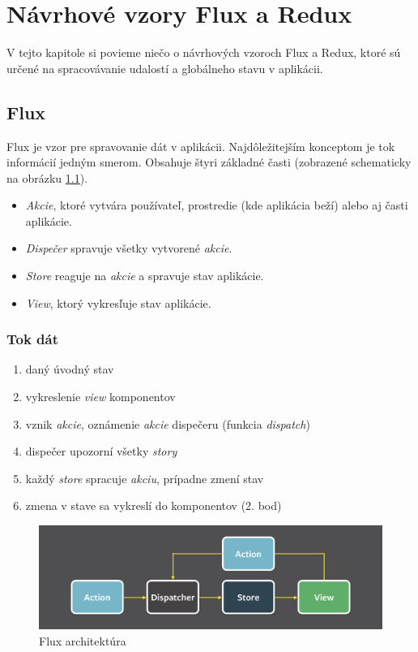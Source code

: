 \chapter{Návrhové vzory Flux a Redux}

\label{kap:vzory} %

V tejto kapitole si povieme niečo o návrhových vzoroch Flux a Redux, ktoré sú určené na spracovávanie udalostí a globálneho stavu v aplikácii.

\section{Flux}
\label{sec:flux}
Flux \cite[Overview]{Flux} je vzor pre spravovanie dát v aplikácii. Najdôležitejším konceptom je tok informácií jedným smerom. Obsahuje štyri základné časti (zobrazené schematicky na obrázku \ref{obr:flux}). 
\begin{itemize}
\item \emph{Akcie}, ktoré vytvára používateľ, prostredie (kde aplikácia beží) alebo aj časti aplikácie. 
\item \emph{Dispečer} spravuje všetky vytvorené \emph{akcie}. 
\item \emph{Store} reaguje na \emph{akcie} a spravuje stav aplikácie.
\item \emph{View}, ktorý vykresľuje stav aplikácie.
\end{itemize}

\subsection{Tok dát}
\begin{enumerate}
\item daný úvodný stav
\item vykreslenie \emph{view} komponentov
\item vznik \emph{akcie}, oznámenie \emph{akcie} dispečeru (funkcia \emph{dispatch})
\item dispečer upozorní všetky \emph{story}
\item každý \emph{store} spracuje \emph{akciu}, prípadne zmení stav
\item zmena v stave sa vykreslí do komponentov (2. bod)
\end{enumerate}

\begin{figure}
  \centering
    \includegraphics[width=\textwidth]{./images/flux.png}
  \caption{Flux architektúra \cite{FluxObr}}\label{obr:flux}
\end{figure}

